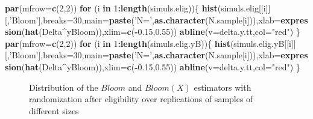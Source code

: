 \documentclass[]{book}
\newenvironment{Shaded}{\begin{snugshade}}{\end{snugshade}}
\newcommand{\KeywordTok}[1]{\textcolor[rgb]{0.13,0.29,0.53}{\textbf{#1}}}
\newcommand{\DataTypeTok}[1]{\textcolor[rgb]{0.13,0.29,0.53}{#1}}
\newcommand{\DecValTok}[1]{\textcolor[rgb]{0.00,0.00,0.81}{#1}}
\newcommand{\FloatTok}[1]{\textcolor[rgb]{0.00,0.00,0.81}{#1}}
\newcommand{\StringTok}[1]{\textcolor[rgb]{0.31,0.60,0.02}{#1}}
\newcommand{\ControlFlowTok}[1]{\textcolor[rgb]{0.13,0.29,0.53}{\textbf{#1}}}
\newcommand{\OperatorTok}[1]{\textcolor[rgb]{0.81,0.36,0.00}{\textbf{#1}}}
\newcommand{\NormalTok}[1]{#1}
\theoremstyle{definition}
\theoremstyle{definition}
\theoremstyle{definition}
\theoremstyle{remark}
\begin{document}
\begin{Shaded}
\begin{Highlighting}[]
\KeywordTok{par}\NormalTok{(}\DataTypeTok{mfrow=}\KeywordTok{c}\NormalTok{(}\DecValTok{2}\NormalTok{,}\DecValTok{2}\NormalTok{))}
\ControlFlowTok{for}\NormalTok{ (i }\ControlFlowTok{in} \DecValTok{1}\OperatorTok{:}\KeywordTok{length}\NormalTok{(simuls.elig))\{}
  \KeywordTok{hist}\NormalTok{(simuls.elig[[i]][,}\StringTok{'Bloom'}\NormalTok{],}\DataTypeTok{breaks=}\DecValTok{30}\NormalTok{,}\DataTypeTok{main=}\KeywordTok{paste}\NormalTok{(}\StringTok{'N='}\NormalTok{,}\KeywordTok{as.character}\NormalTok{(N.sample[i])),}\DataTypeTok{xlab=}\KeywordTok{expression}\NormalTok{(}\KeywordTok{hat}\NormalTok{(Delta}\OperatorTok{^}\NormalTok{yBloom)),}\DataTypeTok{xlim=}\KeywordTok{c}\NormalTok{(}\OperatorTok{-}\FloatTok{0.15}\NormalTok{,}\FloatTok{0.55}\NormalTok{))}
  \KeywordTok{abline}\NormalTok{(}\DataTypeTok{v=}\NormalTok{delta.y.tt,}\DataTypeTok{col=}\StringTok{"red"}\NormalTok{)}
\NormalTok{\}}
\KeywordTok{par}\NormalTok{(}\DataTypeTok{mfrow=}\KeywordTok{c}\NormalTok{(}\DecValTok{2}\NormalTok{,}\DecValTok{2}\NormalTok{))}
\ControlFlowTok{for}\NormalTok{ (i }\ControlFlowTok{in} \DecValTok{1}\OperatorTok{:}\KeywordTok{length}\NormalTok{(simuls.elig.yB))\{}
  \KeywordTok{hist}\NormalTok{(simuls.elig.yB[[i]][,}\StringTok{'Bloom'}\NormalTok{],}\DataTypeTok{breaks=}\DecValTok{30}\NormalTok{,}\DataTypeTok{main=}\KeywordTok{paste}\NormalTok{(}\StringTok{'N='}\NormalTok{,}\KeywordTok{as.character}\NormalTok{(N.sample[i])),}\DataTypeTok{xlab=}\KeywordTok{expression}\NormalTok{(}\KeywordTok{hat}\NormalTok{(Delta}\OperatorTok{^}\NormalTok{yBloom)),}\DataTypeTok{xlim=}\KeywordTok{c}\NormalTok{(}\OperatorTok{-}\FloatTok{0.15}\NormalTok{,}\FloatTok{0.55}\NormalTok{))}
  \KeywordTok{abline}\NormalTok{(}\DataTypeTok{v=}\NormalTok{delta.y.tt,}\DataTypeTok{col=}\StringTok{"red"}\NormalTok{)}
\NormalTok{\}}
\end{Highlighting}
\end{Shaded}

\begin{figure}[htbp]

{\centering {}

}

\caption{Distribution of the $Bloom$ and $Bloom(X)$ estimators with randomization after eligibility over replications of samples of different sizes}\label{fig:montecarlohisteligbloom}
\end{figure}
\end{document}

